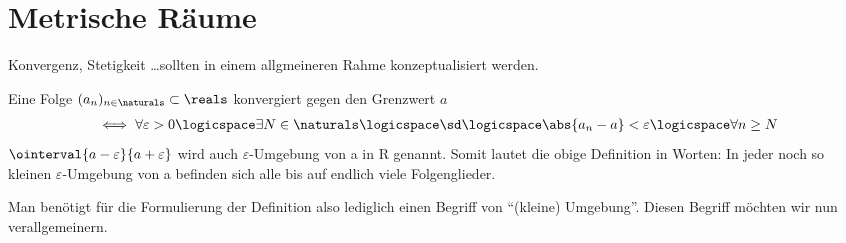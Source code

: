 \chapter{Metrische Räume}
\begin{ziel*}
    Konvergenz, Stetigkeit \ldots sollten in einem allgmeineren Rahme konzeptualisiert werden.
\end{ziel*}
\begin{erinnerung*}[\diffcourse{1}]
    Eine Folge \( (a_n)_{n\in \naturals}\subset \reals \) konvergiert gegen den Grenzwert \( a \)
    \begin{align*}
        \iff \forall \varepsilon>0 \logicspace\exists N\in \naturals\logicspace\text{\sd}\logicspace \abs{a_n-a}<\varepsilon\logicspace\forall n \geq N
    \end{align*}
    \( \ointerval{a-\varepsilon}{a+\varepsilon} \) wird auch \( \varepsilon \)-Umgebung von a in R genannt. 
    Somit lautet die obige Definition in Worten: 
    In jeder noch so kleinen \( \varepsilon \)-Umgebung von a befinden sich alle bis auf endlich viele Folgenglieder.    
\end{erinnerung*}
Man benötigt für die Formulierung der Definition also lediglich einen Begriff von \enquote{(kleine) Umgebung}. 
Diesen Begriff möchten wir nun verallgemeinern.
    
